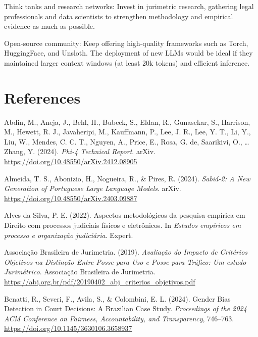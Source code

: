 \documentclass[
  12pt,
]{article}
\newlength{\cslhangindent}
\newenvironment{CSLReferences}[2] %
 {\begin{list}{}{%
  \setlength{\itemindent}{0pt}
  \setlength{\leftmargin}{0pt}
  \setlength{\parsep}{0pt}
  \ifodd #1
   \setlength{\leftmargin}{\cslhangindent}
   \setlength{\itemindent}{-1\cslhangindent}
  \fi
  \setlength{\itemsep}{#2\baselineskip}}}
 {\end{list}}
\begin{document}
Think tanks and research networks: Invest in jurimetric research,
gathering legal professionals and data scientists to strengthen
methodology and empirical evidence as much as possible.

Open-source community: Keep offering high-quality frameworks such as
Torch, HuggingFace, and Unsloth. The deployment of new LLMs would be
ideal if they maintained larger context windows (at least 20k tokens)
and efficient inference.

\newpage{}

\section{References}\label{sec-references}

\label{refs}
\begin{CSLReferences}{1}{0}
Abdin, M., Aneja, J., Behl, H., Bubeck, S., Eldan, R., Gunasekar, S.,
Harrison, M., Hewett, R. J., Javaheripi, M., Kauffmann, P., Lee, J. R.,
Lee, Y. T., Li, Y., Liu, W., Mendes, C. C. T., Nguyen, A., Price, E.,
Rosa, G. de, Saarikivi, O., \ldots{} Zhang, Y. (2024). \emph{Phi-4
{Technical} {Report}}. arXiv.
\url{https://doi.org/10.48550/arXiv.2412.08905}

Almeida, T. S., Abonizio, H., Nogueira, R., \& Pires, R. (2024).
\emph{Sabiá-2: {A} {New} {Generation} of {Portuguese} {Large} {Language}
{Models}}. arXiv. \url{https://doi.org/10.48550/arXiv.2403.09887}

Alves da Silva, P. E. (2022). Aspectos metodológicos da pesquisa
empírica em {Direito} com processos judiciais físicos e eletrônicos. In
\emph{Estudos empíricos em processo e organização judiciária}. Expert.

Associação Brasileira de Jurimetria. (2019). \emph{Avaliação do
{Impacto} de {Critérios} {Objetivos} na {Distinção} {Entre} {Posse} para
{Uso} e {Posse} para {Tráfico}: {Um} estudo {Jurimétrico}}. Associação
Brasileira de Jurimetria.
\url{https://abj.org.br/pdf/20190402_abj_criterios_objetivos.pdf}

Benatti, R., Severi, F., Avila, S., \& Colombini, E. L. (2024). Gender
{Bias} {Detection} in {Court} {Decisions}: {A} {Brazilian} {Case}
{Study}. \emph{Proceedings of the 2024 {ACM} {Conference} on {Fairness},
{Accountability}, and {Transparency}}, 746--763.
\url{https://doi.org/10.1145/3630106.3658937}


\end{CSLReferences}
\end{document}
